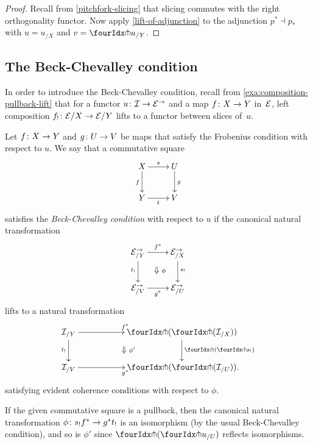 \documentclass[reqno,10pt,a4paper,oneside,draft]{amsart}
\begin{document}
\begin{proof}
Recall from \cref{pitchfork-slicing} that slicing commutes with the right orthogonality functor.
Now apply \cref{lift-of-adjunction} to the adjunction $p^* \dashv p_*$ with $u = u_{/X}$ and $v = {\liftr{u}}_{/Y}$.
\end{proof}

\subsection*{The Beck-Chevalley condition}

In order to introduce the Beck-Chevalley condition, recall from \cref{exa:composition-pullback-lift} that for a functor $u \colon \mathcal{I} \to \mathcal{E}^\to$ and a map $f \colon X \to Y$ in~$\mathcal{E}$, left composition $f_! \colon \mathcal{E}/X \to \mathcal{E}/Y$ lifts to a functor between slices of~$u$.

\begin{definition} \label{def:beck-chevalley}
Let $f \colon X \to Y$ and $g \colon U \to V$ be maps that satisfy the Frobenius condition with respect to $u$.
We say that a commutative square
\[
\xymatrix{
  X
  \ar[d]_{f}
  \ar[r]^{s}
&
  U
  \ar[d]^{g}
\\
  Y
  \ar[r]_{t}
&
  V
}
\]
satisfies the \emph{Beck-Chevalley condition} with respect to $u$ if the canonical natural transformation
\[
\xymatrix{
  \catE^\to_{/Y}
   \ar[d]_{t_!}
  \ar[r]^{f^*}
  \ar@{}[dr]|{\textstyle\Downarrow \rlap{$\labelstyle\phi$}}
&
  \catE^\to_{/X}
  \ar[d]^{s_!}
\\
  \catE^\to_{/V}
  \ar[r]_{g^*}
&
  \catE^\to_{/U}
}
\]
lifts to a natural transformation
\[
\xymatrix@C+3em{
  \cal{I}_{/Y}
  \ar[r]^{f^*}
  \ar[d]_{t_!}
  \ar@{}[dr]|{\textstyle\Downarrow \rlap{$\labelstyle\phi'$}}
&
  {\liftl{(\liftr{(\cal{I}_{/X})})}}
  \ar[d]^{\liftl{(\liftr{s_!})}}
\\
  \cal{I}_{/V}
  \ar[r]_{g^*}
&
  {\liftl{(\liftr{(\cal{I}_{/U})})}}
\rlap{.}}
\]
satisfying evident coherence conditions with respect to $\phi$.
\end{definition}

\begin{remark} \label{beck-chevalley-iso}
If the given commutative square is a pullback, then the canonical natural transformation $\phi \colon s_! f^* \to g^* t_!$ is an isomorphism (by the usual Beck-Chevalley condition), and so is $\phi'$ since $\liftl{(\liftr{u_{/U}})}$ reflects isomorphisms.
\end{remark}
\end{document}
